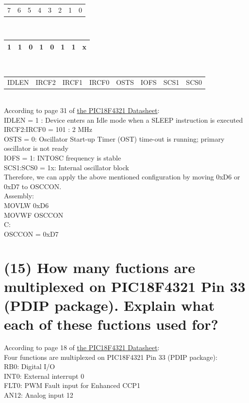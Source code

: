 \documentclass{article}
\begin{document}
\begin{tabular}{p{1.015cm}p{1.015cm}p{1.015cm}p{1.015cm}p{1.015cm}p{1.015cm}p{1.015cm}p{1.015cm}}
  7&6&5&4&3&2&1&0\\
\end{tabular}\\
\begin{tabular}{|p{1cm}|p{1cm}|p{1cm}|p{1cm}|p{1cm}|p{1cm}|p{1cm}|p{1cm}|}
  \hline
  1&1&0&1&0&1&1&x\\
  \hline
\end{tabular}\\
\begin{tabular}{p{1cm}p{1cm}p{1cm}p{1cm}p{1cm}p{1cm}p{1cm}p{1cm}}
  IDLEN&IRCF2&IRCF1&IRCF0&OSTS&IOFS&SCS1&SCS0\\
\end{tabular}\\
\newline
According to page 31 of \href{http://ww1.microchip.com/downloads/en/DeviceDoc/39689b.pdf}{the PIC18F4321 Datasheet}:\\
IDLEN = 1 : Device enters an Idle mode when a SLEEP instruction is executed\\
IRCF2:IRCF0 = 101 : 2 MHz\\
OSTS = 0: Oscillator Start-up Timer (OST) time-out is running; primary oscillator is not ready\\
IOFS = 1: INTOSC frequency is stable\\
SCS1:SCS0 = 1x: Internal oscillator block\\
\newline
Therefore, we can apply the above mentioned configuration by moving 0xD6 or 0xD7 to OSCCON.\\ 
\newline
Assembly:\\
MOVLW 0xD6\\
MOVWF OSCCON\\
\newline
C:\\
OSCCON = 0xD7

\newpage

\section{(15) How many fuctions are multiplexed on PIC18F4321 Pin 33 (PDIP package). Explain what each of these fuctions used for?}
According to page 18 of \href{http://ww1.microchip.com/downloads/en/DeviceDoc/39689b.pdf}{the PIC18F4321 Datasheet}:\\
Four functions are multiplexed on PIC18F4321 Pin 33 (PDIP package):\\
\newline
RB0: Digital I/O\\
INT0: External interrupt 0\\
FLT0: PWM Fault input for Enhanced CCP1\\
AN12: Analog input 12
\end{document}
